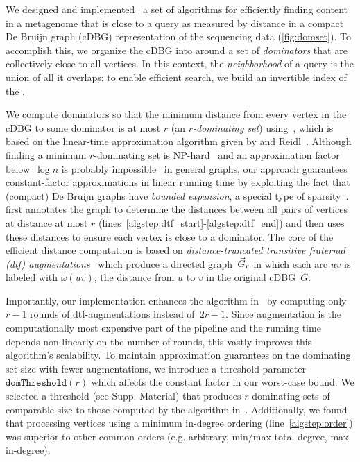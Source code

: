 We designed and implemented~\cite{spacegraphcats} a set of algorithms for efficiently
finding content in a metagenome that is close to a query as measured
by distance in a compact De Bruijn graph (cDBG) representation of the
sequencing data (\autoref{fig:domset}). To accomplish this, we organize the cDBG into {\em \pieces}
around a set of \emph{dominators} that are collectively close to all vertices. In this
context, the {\em neighborhood} of a query is the union of all \pieces it overlaps;
to enable efficient search, we build an invertible index of the \pieces.

We compute dominators so that the minimum distance from every vertex
in the cDBG to some dominator is at most $r$ (an \emph{$r$-dominating set})
using~, which is based on the linear-time approximation algorithm
given by \Dvorak and Reidl~\cite{felixThesis}. Although finding a minimum $r$-dominating set is
NP-hard~\cite{karp1972reducibility,chlebik2008approximation,downey2012parameterized} and
an approximation factor below~$\log n$ is probably impossible~\cite{chlebik2008approximation}
in general graphs, our approach guarantees constant-factor approximations
in linear running time by exploiting the fact that
(compact) De Bruijn graphs have \emph{bounded expansion}, a special type of
sparsity~\cite{sparsity}.  first
annotates the graph to determine the distances between all pairs of vertices at
distance at most $r$ (lines~\ref{algstep:dtf_start}-\ref{algstep:dtf_end}) and
then uses these distances to ensure each vertex is close to a dominator.
The core of the efficient distance computation is based on
\emph{distance-truncated transitive fraternal (dtf) augmentations}~\cite{felixThesis}
which produce a directed graph~$\vec{G}_r$ in which each arc $uv$ is labeled with
$\omega(uv)$, the distance from $u$ to $v$ in the original cDBG~$G$.

Importantly, our implementation enhances the algorithm
in~\cite{felixThesis} by computing only $r{-}1$ rounds of dtf-augmentations
instead of~$2r{-}1$. Since augmentation is the computationally most
expensive part of the pipeline and the running time depends non-linearly on
the number of rounds, this vastly improves this algorithm's scalability.
To maintain approximation guarantees on the dominating set size with fewer augmentations,
we introduce a threshold parameter $\texttt{domThreshold}(r)$
which affects the constant factor in our worst-case bound.
We selected a threshold (see Supp. Material) that produces $r$-dominating sets of
comparable size to those computed by the algorithm in~\cite{felixThesis}. Additionally,
we found that processing vertices using a minimum in-degree ordering (line~\ref{algstep:order})
was superior to other common orders (e.g. arbitrary, min/max total degree, max in-degree).

